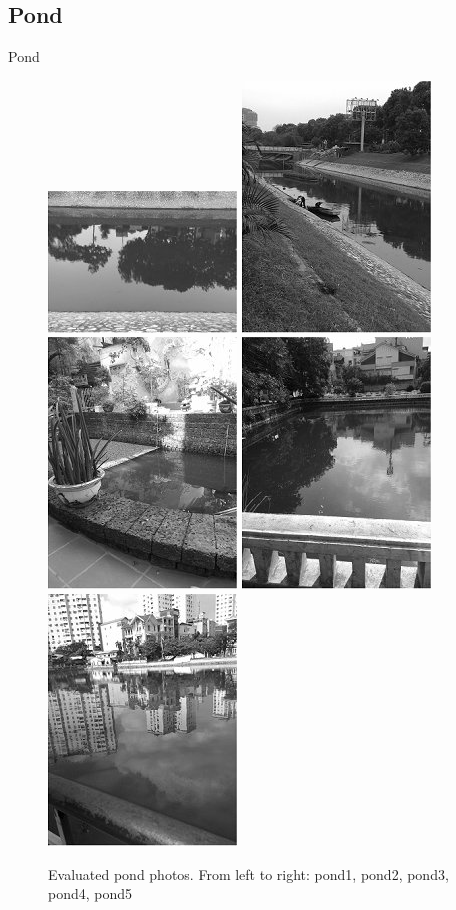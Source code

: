 \documentclass{beamer}
\begin{document}
\subsection{Pond}
\begin{frame}{Pond}
\begin{center}
\begin{figure}[h]
	\centering
	\includegraphics[width=0.18\columnwidth]{images/pond1.jpg}
	\includegraphics[width=0.18\columnwidth]{images/pond2.jpg}
	\includegraphics[width=0.18\columnwidth]{images/pond3.jpg}
	\includegraphics[width=0.18\columnwidth]{images/pond4.jpg}
	\includegraphics[width=0.18\columnwidth]{images/pond5.jpg}
	\caption{Evaluated pond photos. From left to right: pond1, pond2, pond3, pond4, pond5}
	\label{fig:pond}
\end{figure}


\end{center}
\end{frame}
\end{document}
